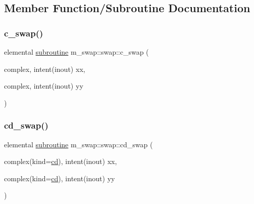 \subsection{Member Function/\+Subroutine Documentation}
\mbox{\label{interfacem__swap_1_1swap_abc8e098e94291dfc161f962397cc2ace}} 
\subsubsection{\texorpdfstring{c\+\_\+swap()}{c\_swap()}}
{\footnotesize\ttfamily elemental \hyperlink{M__stopwatch_83_8txt_acfbcff50169d691ff02d4a123ed70482}{subroutine} m\+\_\+swap\+::swap\+::c\+\_\+swap (\begin{DoxyParamCaption}\item[{complex, intent(inout)}]{xx,  }\item[{complex, intent(inout)}]{yy }\end{DoxyParamCaption})\hspace{0.3cm}{\ttfamily [private]}}

\mbox{\label{interfacem__swap_1_1swap_a65fb0d905f22f4e6e75a3d7ba047a3e3}} 
\subsubsection{\texorpdfstring{cd\+\_\+swap()}{cd\_swap()}}
{\footnotesize\ttfamily elemental \hyperlink{M__stopwatch_83_8txt_acfbcff50169d691ff02d4a123ed70482}{subroutine} m\+\_\+swap\+::swap\+::cd\+\_\+swap (\begin{DoxyParamCaption}\item[{complex(kind=\hyperlink{namespacem__swap_af14229bde3625fba5d65e401fd16c3d1}{cd}), intent(inout)}]{xx,  }\item[{complex(kind=\hyperlink{namespacem__swap_af14229bde3625fba5d65e401fd16c3d1}{cd}), intent(inout)}]{yy }\end{DoxyParamCaption})\hspace{0.3cm}{\ttfamily [private]}}

\mbox{\label{interfacem__swap_1_1swap_af40eecd62f8cb1bbe7d207c06163bf64}} 
